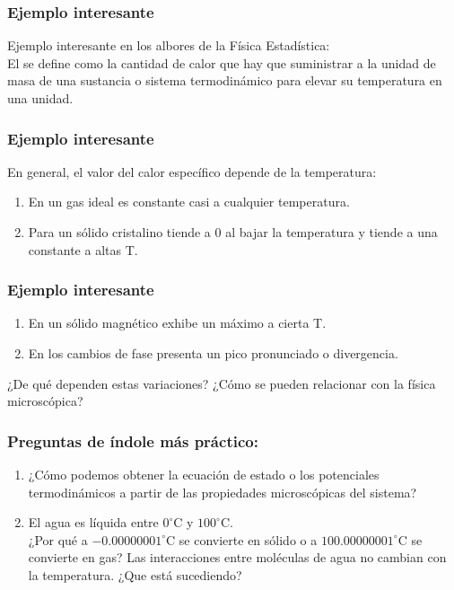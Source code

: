 \documentclass[12pt]{beamer}
\begin{document}
\begin{frame}
\frametitle{Ejemplo interesante}
Ejemplo interesante en los albores de la Física Estadística:
\\
\bigskip
\pause
El  se define como la cantidad de calor que hay que suministrar a la unidad de masa de una sustancia o sistema termodinámico para elevar su temperatura en una unidad.
\end{frame}
\begin{frame}
\frametitle{Ejemplo interesante}
En general, el valor del calor específico depende de la temperatura:
\pause
{}
\begin{enumerate}[<+->]
\item En un gas ideal es constante casi a cualquier temperatura.
\item Para un sólido cristalino tiende a 0 al bajar la temperatura y tiende a una constante a altas T.
\seti
\end{enumerate}
\end{frame}
\begin{frame}
\frametitle{Ejemplo interesante}
\begin{enumerate}[<+->]
\conti
\item En un sólido magnético exhibe un máximo a cierta T.
\item En los cambios de fase presenta un pico pronunciado o divergencia.
\end{enumerate}
\pause
¿De qué dependen estas variaciones? \pause ¿Cómo se pueden relacionar con la física microscópica?
\end{frame}
\begin{frame}
\frametitle{Preguntas de índole más práctico:}
\begin{enumerate}[<+->]
\item ¿Cómo podemos obtener la ecuación de estado o los potenciales termodinámicos a partir de las propiedades microscópicas del sistema?
\item El agua es líquida entre $0^{\circ} \text{C}$ y $100^{\circ} \text{C}$.
\\ \pause
¿Por qué a $-0.00000001^{\circ} \text{C}$ se convierte en sólido \pause o a $100.00000001^{\circ} \text{C}$ se convierte en gas? \pause Las interacciones entre moléculas de agua no cambian con la temperatura. \pause ¿Que está sucediendo?
\seti
\end{enumerate}
\end{frame}
\end{document}
